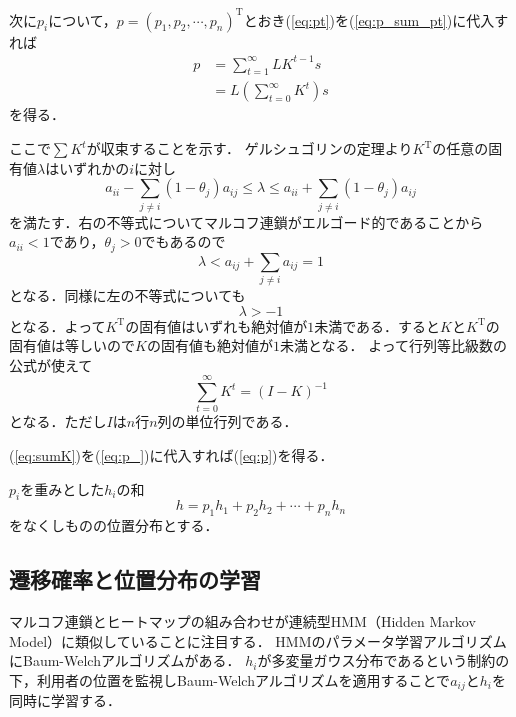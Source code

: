 次に$ p_i $について，$ p = (p_1 , p_2 , \cdots , p_n)^\mathrm{T} $とおき(\ref{eq:pt})を(\ref{eq:p_sum_pt})に代入すれば
\begin{align}
    p &= \sum_{t=1}^{\infty} L K^{t - 1} s \nonumber \\
    &= L \left( \sum_{t=0}^{\infty} K^t \right) s \label{eq:p_}
\end{align}
を得る．

ここで$ \sum K^t $が収束することを示す．
ゲルシュゴリンの定理\cite{s_saito}より$ K^\mathrm{T} $の任意の固有値$ \lambda $はいずれかの$ i $に対し
\begin{equation*}
    a_{i i} - \sum_{j \ne i}(1 - \theta_j) a_{i j} \le \lambda \le a_{i i} + \sum_{j \ne i}(1 - \theta_j) a_{i j}
\end{equation*}
を満たす．右の不等式についてマルコフ連鎖がエルゴード的であることから$ a_{i i} < 1 $\cite{funaki}であり，$ \theta_j > 0 $でもあるので
\begin{equation*}
    \lambda < a_{i j} + \sum_{j \ne i} a_{i j} = 1
\end{equation*}
となる．同様に左の不等式についても
\begin{equation*}
    \lambda > -1
\end{equation*}
となる．よって$ K^\mathrm{T} $の固有値はいずれも絶対値が$ 1 $未満である．すると$ K $と$ K^\mathrm{T} $の固有値は等しいので$ K $の固有値も絶対値が$ 1 $未満となる．
よって行列等比級数の公式\cite{m_saito}が使えて
\begin{equation} \label{eq:sumK}
    \sum_{t=0}^{\infty} K^t = (I - K)^{-1}
\end{equation}
となる．ただし$ I $は$ n $行$ n $列の単位行列である．

(\ref{eq:sumK})を(\ref{eq:p_})に代入すれば(\ref{eq:p})を得る．

$ p_i $を重みとした$ h_i $の和
\begin{equation} \label{eq:h}
    h = p_1 h_1 + p_2 h_2 + \cdots + p_n h_n
\end{equation}
をなくしものの位置分布とする．

\subsection{遷移確率と位置分布の学習}
マルコフ連鎖とヒートマップの組み合わせが連続型HMM（Hidden Markov Model）に類似していることに注目する．
HMMのパラメータ学習アルゴリズムにBaum-Welchアルゴリズムがある．\cite{ishii_ueda}
$ h_i $が多変量ガウス分布であるという制約の下，利用者の位置を監視しBaum-Welchアルゴリズムを適用することで$ a_{i j} $と$ h_i $を同時に学習する．

